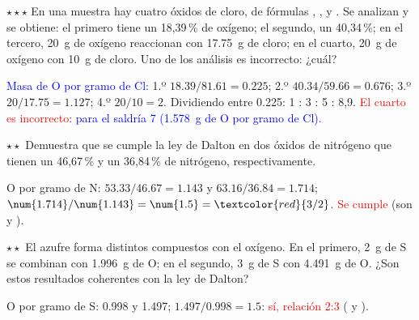 \begin{exercise}
    \(\star\star\star\) En una muestra hay cuatro óxidos de cloro, de fórmulas , ,  y . Se analizan y
    se obtiene: el primero tiene un 18,39\,\% de oxígeno; el segundo, un 40,34\,\%; en el tercero, \qty{20}{\gram} de oxígeno reaccionan con
    \qty{17.75}{\gram} de cloro; en el cuarto, \qty{20}{\gram} de oxígeno con \qty{10}{\gram} de cloro. Uno de los análisis es incorrecto:
    ¿cuál?
    \begin{solu}
        \textcolor{blue}{Masa de O por gramo de Cl:} 1.º \(\num{18.39}/\num{81.61} = \num{0.225}\); 2.º \(\num{40.34}/\num{59.66} = \num{0.676}\);
        3.º \(20/\num{17.75} = \num{1.127}\); 4.º \(20/10 = 2\). Dividiendo entre \num{0.225}: 1 : 3 : 5 : 8,9.
        \textcolor{red}{El cuarto es incorrecto}: \textcolor{blue}{para el  saldría 7 (\qty{1.578}{\gram} de O por gramo de Cl).}
    \end{solu}
\end{exercise}

\begin{exercise}
    \(\star\star\) Demuestra que se cumple la ley de Dalton en dos óxidos de nitrógeno que tienen un 46,67\,\% y un 36,84\,\% de
    nitrógeno, respectivamente.
    \begin{solu}
        O por gramo de N: \(\num{53.33}/\num{46.67} = \num{1.143}\) y \(\num{63.16}/\num{36.84} = \num{1.714}\);
        \(\num{1.714}/\num{1.143} = \num{1.5} = \textcolor{red}{3/2}\). \textcolor{red}{Se cumple} (son  y ).
    \end{solu}
\end{exercise}

\begin{exercise}
    \(\star\star\) El azufre forma distintos compuestos con el oxígeno. En el primero, \qty{2}{\gram} de S se combinan con \qty{1.996}{\gram}
    de O; en el segundo, \qty{3}{\gram} de S con \qty{4.491}{\gram} de O. ¿Son estos resultados coherentes con la ley de Dalton?
    \begin{solu}
        O por gramo de S: \num{0.998} y \num{1.497}; \(\num{1.497}/\num{0.998} = \num{1.5}\): \textcolor{red}{sí, relación 2:3} ( y ).
    \end{solu}
\end{exercise}

